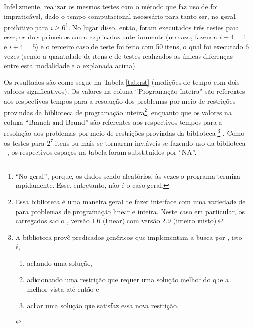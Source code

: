 Infelizmente, realizar os mesmos testes com o método que faz uso de
 foi impraticável, dado o tempo
computacional necessário para tanto ser, no geral, proibitivo para
$i \geq 6$\footnote{``No geral'', porque, os dados sendo aleatórios,
  às vezes o programa termina rapidamente. Esse, entretanto, não é o
  caso geral.}. No lugar disso, então, foram executados três testes
para esse, os dois primeiros como explicados anteriormente (no caso,
fazendo $i + 4 = 4$ e $i + 4 = 5$) e o terceiro caso de teste foi
feito com 50 itens, o qual foi executado 6 vezes (sendo a quantidade de
itens e de testes realizados as únicas diferenças entre esta
modalidade e a explanada acima).

Os resultados são como segue na Tabela \ref{tab:rst} (medições de tempo com
dois valores significativos). Os valores na coluna ``Programação
Inteira'' são referentes aos respectivos tempos para a resolução dos
problemas por meio de restrições provindas da biblioteca
 de programação inteira\footnote{Essa biblioteca
  \eclipse é uma maneira geral de fazer interface com uma variedade de
   para problemas de programação linear e
  inteira. Neste caso em particular, os  carregados
  são o , versão 1.6 (linear) com
   versão 2.9 (inteiro misto)\cite{coin}.}, enquanto
que os valores na
coluna ``Branch and Bound'' são referentes aos respectivos tempos para
a resolução dos problemas por meio de restrições provindas da
biblioteca \footnote{A biblioteca
  \eclipse {} provê predicados genéricos
  que implementam a busca por , isto é,
  \begin{enumerate}
  \item achando uma solução,
  \item adicionando uma restrição que requer uma solução melhor do
    que a melhor vista até então e
  \item achar uma solução que satisfaz essa nova restrição.
  \end{enumerate}} . Como os
  testes para $2^7$ itens ou mais se tornaram inviáveis se fazendo uso
  da biblioteca \eclipse\ , os
  respectivos espaços na tabela foram substituídos por ``NA''.

